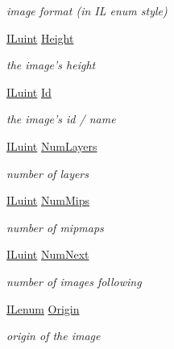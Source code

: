 \begin{DoxyCompactItemize}
\begin{DoxyCompactList}\small\item\em image format (in I\+L enum style) \end{DoxyCompactList}\item 
\hyperlink{group__il__types_gaff8e86a1072c8d7cfe387fb87c6ed8e1}{I\+Luint} \hyperlink{struct_i_l_uinfo_a8a8093d76b61a95fc96df24af29b107a}{Height}
\begin{DoxyCompactList}\small\item\em the image's height \end{DoxyCompactList}\item 
\hyperlink{group__il__types_gaff8e86a1072c8d7cfe387fb87c6ed8e1}{I\+Luint} \hyperlink{struct_i_l_uinfo_aa8396db6e508ed4a5dfc812e6840123d}{Id}
\begin{DoxyCompactList}\small\item\em the image's id / name \end{DoxyCompactList}\item 
\hyperlink{group__il__types_gaff8e86a1072c8d7cfe387fb87c6ed8e1}{I\+Luint} \hyperlink{struct_i_l_uinfo_a76780bfd8409518a48a5e0e3d28ff3ae}{Num\+Layers}
\begin{DoxyCompactList}\small\item\em number of layers \end{DoxyCompactList}\item 
\hyperlink{group__il__types_gaff8e86a1072c8d7cfe387fb87c6ed8e1}{I\+Luint} \hyperlink{struct_i_l_uinfo_a157efa5d606d0da51d39a63380255a5a}{Num\+Mips}
\begin{DoxyCompactList}\small\item\em number of mipmaps \end{DoxyCompactList}\item 
\hyperlink{group__il__types_gaff8e86a1072c8d7cfe387fb87c6ed8e1}{I\+Luint} \hyperlink{struct_i_l_uinfo_a4d2c3fed597dfde7feaea3217ef1ac35}{Num\+Next}
\begin{DoxyCompactList}\small\item\em number of images following \end{DoxyCompactList}\item 
\hyperlink{group__il__types_ga62ca73445716183ef42b1f3906a45ed0}{I\+Lenum} \hyperlink{struct_i_l_uinfo_a6f7c49ddc9cd419e2d2af24255df902a}{Origin}
\begin{DoxyCompactList}\small\item\em origin of the image \end{DoxyCompactList}\item 

\end{DoxyCompactItemize}
